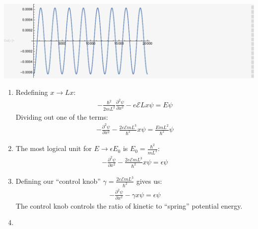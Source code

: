 \documentclass[12pt]{article}
\newcommand{\p}[2]{\frac{\partial #1}{\partial #2}}
\begin{document}
\begin{enumerate}
\begin{enumerate}
            \includegraphics{HW_6_screenshots/q_5_gr6}

        \end{enumerate}
        \begin{enumerate}
            \item Redefining $x\rightarrow Lx$:
            \begin{gather}
                -\frac{\hbar^2}{2mL^2}\p{^2\psi}{x^2}-e\mathcal{E}Lx\psi=E\psi
            \end{gather}
            Dividing out one of the terms:
            \begin{gather}
                -\p{^2\psi}{x^2}-\frac{2e\mathcal{E}mL^3}{\hbar^2}x\psi=\frac{EmL^2}{\hbar^2}\psi
            \end{gather}
            \item The most logical unit for $E\rightarrow\epsilon E_0$ is $E_0=\frac{\hbar^2}{mL^2}$:
            \begin{gather*}
                -\p{^2\psi}{x^2}-\frac{2e\mathcal{E}mL^3}{\hbar^2}x\psi=\epsilon\psi
            \end{gather*}
            \item Defining our \enquote{control knob} $\gamma=\frac{2e\mathcal{E}mL^3}{\hbar^2}$ gives us:
            \begin{gather*}
                -\p{^2\psi}{x^2}-\gamma x\psi=\epsilon\psi
            \end{gather*}
            The control knob controls the ratio of kinetic to \enquote{spring} potential energy.
            \item\\


\end{enumerate}
\end{enumerate}
\end{document}
